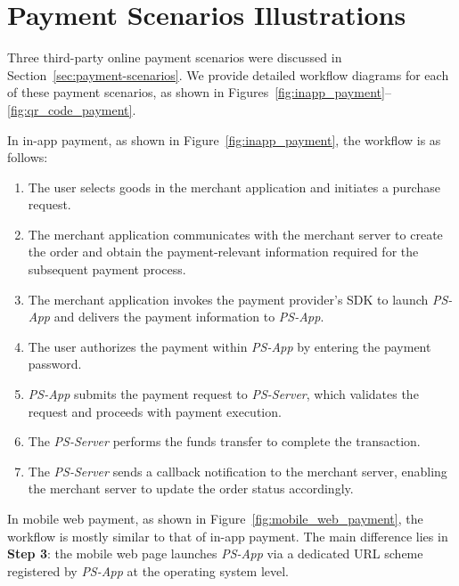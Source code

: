 \appendices

\section{Payment Scenarios Illustrations}

Three third-party online payment scenarios were discussed in Section~\ref{sec:payment-scenarios}.
We provide detailed workflow diagrams for each of these payment scenarios, as shown in Figures~\ref{fig:inapp_payment}--\ref{fig:qr_code_payment}.

In in-app payment, as shown in Figure~\ref{fig:inapp_payment}, the workflow is as follows:

\begin{enumerate}[leftmargin=3.5em]
    \item[\textbf{Step 1}.] The user selects goods in the merchant application and initiates a purchase request.
    \item[\textbf{Step 2}.] The merchant application communicates with the merchant server to create the order and obtain the payment-relevant information required for the subsequent payment process.
    \item[\textbf{Step 3}.] The merchant application invokes the payment provider's SDK to launch \emph{PS-App} and delivers the payment information to \emph{PS-App}.
    \item[\textbf{Step 4}.] The user authorizes the payment within \emph{PS-App} by entering the payment password.
    \item[\textbf{Step 5}.] \emph{PS-App} submits the payment request to \emph{PS-Server}, which validates the request and proceeds with payment execution.
    \item[\textbf{Step 6}.] The \emph{PS-Server} performs the funds transfer to complete the transaction.
    \item[\textbf{Step 7}.] The \emph{PS-Server} sends a callback notification to the merchant server, enabling the merchant server to update the order status accordingly.
\end{enumerate}

In mobile web payment, as shown in Figure~\ref{fig:mobile_web_payment}, the workflow is mostly similar to that of in-app payment.
The main difference lies in \textbf{Step 3}: the mobile web page launches \emph{PS-App} via a dedicated URL scheme registered by \emph{PS-App} at the operating system level.

